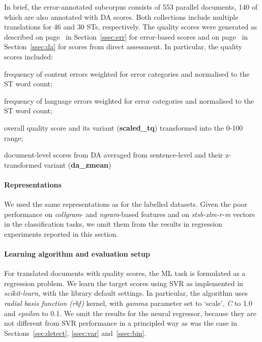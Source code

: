 In brief, the error-annotated subcorpus consists of 553 parallel documents, 140 of which are also annotated with DA scores. Both collections include multiple translations for 46 and 30 STs, respectively.
The quality scores were generated as described on page~\pageref{pg:tq} in Section~\ref{ssec:err} for error-based scores and on page~\pageref{pg:final_da} in Section~\ref{ssec:da} for scores from direct assessment. 
In particular, the quality scores included:
\begin{description}\compresslist{}
	\item[accuracy:] frequency of content errors weighted for error categories and normalised to the ST word count;
	\item[fluency:] frequency of language errors weighted for error categories and normalised to the ST word count;
	\item[tq:] overall quality score and its variant (\textbf{scaled\_tq}) transformed into the 0-100 range;
	\item[da\_mean:] document-level scores from DA averaged from sentence-level and their z-transformed variant (\textbf{da\_zmean})
\end{description}

\paragraph{Representations}

We used the same representations as for the labelled datasets. 
Given the poor performance on \textit{collgram}- and \textit{ngram}-based features and on \textit{stsb-xlm-r-m} vectors in the classification tasks, we omit them from the results in regression experiments reported in this section. 

\paragraph{Learning algorithm and evaluation setup}
For translated documents with quality scores, the ML task is formulated as a regression problem. We learn the target scores using \gls{SVR} as implemented in \textit{scikit-learn}, with the library default settings. In particular, the algorithm uses \textit{radial basis function (rbf)} kernel, with \textit{gamma} parameter set to `scale', \textit{C} to 1.0 and \textit{epsilon} to 0.1.
We omit the results for the neural regressor, because they are not different from SVR performance in a principled way as was the case in Sections~\ref{sec:detect}, \ref{ssec:var} and~\ref{ssec:bin}.

